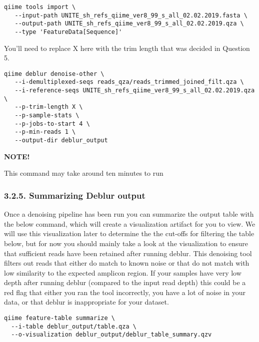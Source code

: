 \documentclass[
]{book}
\newenvironment{greenbox}{
  \definecolor{shadecolor}{RGB}{141, 181, 128}
  \color{white}
  \begin{shaded}}
 {\end{shaded}}
\begin{document}
\begin{verbatim}
qiime tools import \
   --input-path UNITE_sh_refs_qiime_ver8_99_s_all_02.02.2019.fasta \
   --output-path UNITE_sh_refs_qiime_ver8_99_s_all_02.02.2019.qza \
   --type 'FeatureData[Sequence]'
\end{verbatim}

You'll need to replace X here with the trim length that was decided in Question 5.

\begin{verbatim}
qiime deblur denoise-other \
   --i-demultiplexed-seqs reads_qza/reads_trimmed_joined_filt.qza \
   --i-reference-seqs UNITE_sh_refs_qiime_ver8_99_s_all_02.02.2019.qza \
   --p-trim-length X \
   --p-sample-stats \
   --p-jobs-to-start 4 \
   --p-min-reads 1 \
   --output-dir deblur_output
\end{verbatim}

\begin{greenbox}

\begin{center}
\textbf{NOTE!}

\end{center}

This command may take around ten minutes to run

\end{greenbox}

\subsubsection{3.2.5. Summarizing Deblur output}\label{summarizing-deblur-output-2}

Once a denoising pipeline has been run you can summarize the output table with the below command, which will create a visualization artifact for you to view. We will use this visualization later to determine the the cut-offs for filtering the table below, but for now you should mainly take a look at the visualization to ensure that sufficient reads have been retained after running deblur. This denoising tool filters out reads that either do match to known noise or that do not match with low similarity to the expected amplicon region. If your samples have very low depth after running deblur (compared to the input read depth) this could be a red flag that either you ran the tool incorrectly, you have a lot of noise in your data, or that deblur is inappropriate for your dataset.

\begin{verbatim}
qiime feature-table summarize \
  --i-table deblur_output/table.qza \
  --o-visualization deblur_output/deblur_table_summary.qzv
\end{verbatim}
\end{document}
